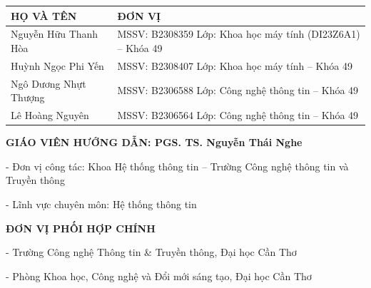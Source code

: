 {}

\par
\vspace{0.6cm}

\noindent
\renewcommand{\arraystretch}{1.5} %
\begin{tabularx}{\textwidth}{|p{6.0cm}|X|}
    \hline
    \centering\textbf{HỌ VÀ TÊN} & \centering\textbf{ĐƠN VỊ} \tabularnewline
    \hline
    Nguyễn Hữu Thanh Hòa & MSSV: B2308359 \newline Lớp: Khoa học máy tính (DI23Z6A1) -- Khóa 49 \\
    \hline
    Huỳnh Ngọc Phi Yến & MSSV: B2308407 \newline Lớp: Khoa học máy tính -- Khóa 49 \\
    \hline
    Ngô Dương Nhựt Thượng & MSSV: B2306588 \newline Lớp: Công nghệ thông tin -- Khóa 49 \\
    \hline
    Lê Hoàng Nguyên & MSSV: B2306564 \newline Lớp: Công nghệ thông tin -- Khóa 49 \\
    \hline
\end{tabularx}

\vspace{1.0cm}

\noindent\textbf{GIÁO VIÊN HƯỚNG DẪN: PGS. TS. Nguyễn Thái Nghe}\par
\vspace{0.2cm}
\noindent - Đơn vị công tác: Khoa Hệ thống thông tin -- Trường Công nghệ thông tin và Truyền thông\par
\vspace{0.15cm}
\noindent - Lĩnh vực chuyên môn: Hệ thống thông tin\par

\vspace{0.8cm}

\noindent\textbf{ĐƠN VỊ PHỐI HỢP CHÍNH}\par
\vspace{0.2cm}
\noindent - Trường Công nghệ Thông tin \& Truyền thông, Đại học Cần Thơ\par
\vspace{0.15cm}
\noindent - Phòng Khoa học, Công nghệ và Đổi mới sáng tạo, Đại học Cần Thơ\par